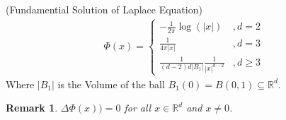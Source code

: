 \documentclass{report}
\theoremstyle{tommy}
\newtheorem{rem}[defn]{Remark}
\begin{document}
\begin{def}(Fundamential Solution of Laplace Equation)
\begin{align*}
  \Phi(x) = 
  \begin{cases}
    - \frac{1}{2 \pi} \log(|x|) &, d = 2 \\
    \frac{1}{4 \pi |x|} &, d = 3 \\
    \frac{1}{(d-2) d |B_1|} \frac{1}{|x|^{d-2}} &, d \ge 3
  \end{cases}
\end{align*}
Where \(|B_1|\) is the Volume of the ball \(B_1(0) = B(0, 1) \subseteq \mathbb{R}^d\).
\end{def}

\begin{rem}
  \(\Delta \Phi(x)) = 0\) for all \(x \in \mathbb{R}^d\) and \(x \ne 0\). 
\end{rem}
\end{document}
